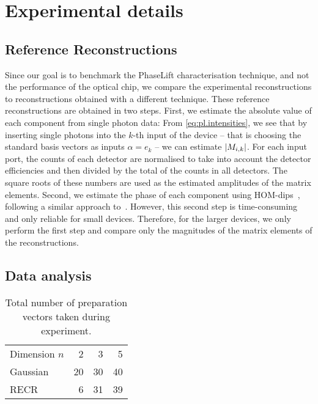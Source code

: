 \section{Experimental details}%
\label{sec:pl.experimental_details}

\subsection{Reference Reconstructions}%
\label{sub:pl.hom_dip}

Since our goal is to benchmark the PhaseLift characterisation technique, and not the performance of the optical chip, we compare the experimental reconstructions to reconstructions obtained with a different technique.
These reference reconstructions are obtained in two steps.
First, we estimate the absolute value of each component from single photon data:
From \cref{eq:pl.intensities}, we see that by inserting single photons into the $k$-th input of the device -- that is choosing the standard basis vectors as inputs $\alpha =  e_k$ --  we can estimate ${\vert M_{i,k}\vert}$.
For each input port, the counts of each detector are normalised to take into account the detector efficiencies and then divided by the total of the counts in all detectors.
The square roots of these numbers are used as the estimated amplitudes of the matrix elements.
Second, we estimate the phase of each component using HOM-dips~\cite{Hong_1987_Measurement}, following a similar approach to~\cite{Laing_2012_SuperStable,Dhand_2016_Accurate}.
However, this second step is time-consuming and only reliable for small devices.
Therefore, for the larger devices, we only perform the first step and compare only the magnitudes of the matrix elements of the reconstructions.


\subsection{Data analysis}%
\label{sub:pl.data_analysis}

\begin{table}
  \centering
  \begin{tabular}{l | r r r}
    Dimension $n$ & 2 & 3 & 5 \\
    Gaussian & 20 & 30 & 40 \\
    RECR & 6 & 31 & 39 \\
  \end{tabular}
  \caption{%
    \label{tab:measurements}
    Total number of preparation vectors taken during experiment.
  }
\end{table}

